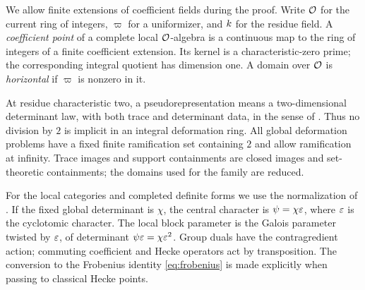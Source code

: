 We allow finite extensions of coefficient fields during the proof.
Write $\mathcal O$ for the current ring of integers, $\varpi$ for a
uniformizer, and $k$ for the residue field. A \emph{coefficient
point} of a complete local $\mathcal O$-algebra is a continuous map to the
ring of integers of a finite coefficient extension. Its kernel is
a characteristic-zero prime; the corresponding integral quotient
has dimension one. A domain over $\mathcal O$ is \emph{horizontal} if
$\varpi$ is nonzero in it.

At residue characteristic two, a pseudorepresentation means a
two-dimensional determinant law, with both trace and determinant
data, in the sense of \cite{Chenevier2014}. Thus no division by $2$
is implicit in an integral deformation ring. All global deformation
problems have a fixed finite ramification set containing $2$ and
allow ramification at infinity. Trace images and support containments
are closed images and set-theoretic containments; the domains used
for the family are reduced.

For the local categories and completed definite forms we use the
normalization of \cite[Section~2]{FM2}. If the fixed global
determinant is $\chi$, the central character is $\psi=\chi\varepsilon$,
where $\varepsilon$ is the cyclotomic character. The local block parameter
is the Galois parameter twisted by $\varepsilon$, of determinant
$\psi\varepsilon=\chi\varepsilon^2$. Group duals have the contragredient action;
commuting coefficient and Hecke operators act by transposition.
The conversion to the Frobenius identity \eqref{eq:frobenius} is
made explicitly when passing to classical Hecke points.

